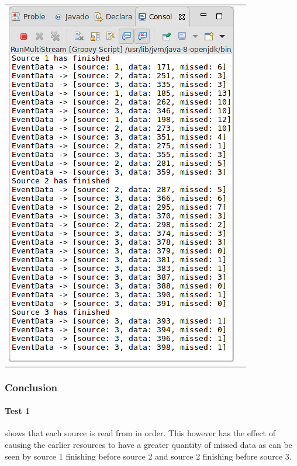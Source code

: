 \begin{tabular}{c|c}
	\includegraphics[width=\textwidth/2]{img/screenshots/9-3-3-2.png} \\

\end{tabular}

\subsubsection*{Conclusion}

\paragraph{Test 1} shows that each source is read from in order.  This however has the effect of causing the earlier resources to have a greater quantity of missed data as can be seen by source 1 finishing before source 2 and source 2 finishing before source 3.

